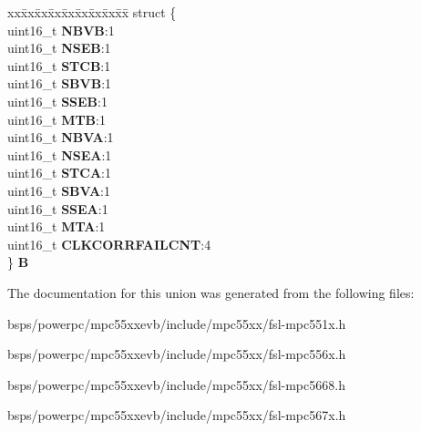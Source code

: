 \begin{DoxyCompactItemize}
\begin{tabbing}
\end{tabbing}\item 
\mbox{\label{unionuPSR2_a2e4bfe033108f74d0935a6eb3014f356}} 
\begin{tabbing}
xx\=xx\=xx\=xx\=xx\=xx\=xx\=xx\=xx\=\kill
struct \{\\
\>uint16\_t {\bfseries NBVB}:1\\
\>uint16\_t {\bfseries NSEB}:1\\
\>uint16\_t {\bfseries STCB}:1\\
\>uint16\_t {\bfseries SBVB}:1\\
\>uint16\_t {\bfseries SSEB}:1\\
\>uint16\_t {\bfseries MTB}:1\\
\>uint16\_t {\bfseries NBVA}:1\\
\>uint16\_t {\bfseries NSEA}:1\\
\>uint16\_t {\bfseries STCA}:1\\
\>uint16\_t {\bfseries SBVA}:1\\
\>uint16\_t {\bfseries SSEA}:1\\
\>uint16\_t {\bfseries MTA}:1\\
\>uint16\_t {\bfseries CLKCORRFAILCNT}:4\\
\} {\bfseries B}\\

\end{tabbing}\end{DoxyCompactItemize}


The documentation for this union was generated from the following files\+:\begin{DoxyCompactItemize}
\item 
bsps/powerpc/mpc55xxevb/include/mpc55xx/fsl-\/mpc551x.\+h\item 
bsps/powerpc/mpc55xxevb/include/mpc55xx/fsl-\/mpc556x.\+h\item 
bsps/powerpc/mpc55xxevb/include/mpc55xx/fsl-\/mpc5668.\+h\item 
bsps/powerpc/mpc55xxevb/include/mpc55xx/fsl-\/mpc567x.\+h\end{DoxyCompactItemize}
